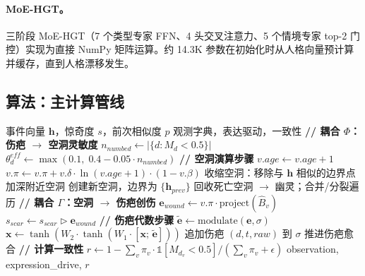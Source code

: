 \documentclass[11pt]{article}
\begin{document}
\paragraph{MoE-HGT。}三阶段 MoE-HGT（7 个类型专家 FFN、4 头交叉注意力、5 个情境专家 top-2 门控）实现为直接 NumPy 矩阵运算。约 14.3K 参数在初始化时从人格向量预计算并缓存，直到人格漂移发生。

\subsection{算法：主计算管线}

\begin{algorithm}[h]
\caption{空洞-伤疤引擎：单事件处理}
\label{alg:pipeline}
\begin{algorithmic}[1]
\REQUIRE 事件向量 $\mathbf{h}$，惊奇度 $s$，前次相似度 $p$
\ENSURE 观测字典，表达驱动，一致性
\STATE \textbf{// 耦合 $\Phi$：伤疤 $\to$ 空洞灵敏度}
\STATE $n_{numbed} \leftarrow |\{d : M_d < 0.5\}|$
\STATE $\theta_d^{eff} \leftarrow \max(0.1,\; 0.4 - 0.05 \cdot n_{numbed})$
\STATE \textbf{// 空洞演算步骤}
  \STATE $v.age \leftarrow v.age + 1$
  \STATE $v.\pi \leftarrow v.\pi + v.\delta \cdot \ln(v.age + 1) \cdot (1 - v.\beta)$
\ENDFOR
\STATE 收缩空洞：移除与 $\mathbf{h}$ 相似的边界点
  \STATE 加深附近空洞
\ENDIF
{}
  \STATE 创建新空洞，边界为 $\{\mathbf{h}_{prev}\}$
\ENDIF
\STATE 回收死亡空洞 $\to$ 幽灵；合并/分裂遍历
\STATE \textbf{// 耦合 $\Gamma$：空洞 $\to$ 伤疤创伤}
  \STATE $\mathbf{e}_{wound} \leftarrow v.\pi \cdot \text{project}(\hat{B}_v)$
  \STATE $s_{scar} \leftarrow s_{scar} \triangleright \mathbf{e}_{wound}$
\ENDFOR
\STATE \textbf{// 伤疤代数步骤}
\STATE $\tilde{\mathbf{e}} \leftarrow \text{modulate}(\mathbf{e}, \sigma)$ 
\STATE $\mathbf{x} \leftarrow \tanh(W_2 \cdot \tanh(W_1 \cdot [\mathbf{x};\, \tilde{\mathbf{e}}]))$ 
  \STATE 追加伤疤 $(d, t, raw)$ 到 $\sigma$ 
\ENDIF
\STATE 推进伤疤愈合 
\STATE \textbf{// 计算一致性}
\STATE $r \leftarrow 1 - \sum_v \pi_v \cdot \mathbb{1}[M_{d_v} < 0.5] / (\sum_v \pi_v + \epsilon)$
\RETURN observation, expression\_drive, $r$
\end{algorithmic}
\end{algorithm}

\end{document}
